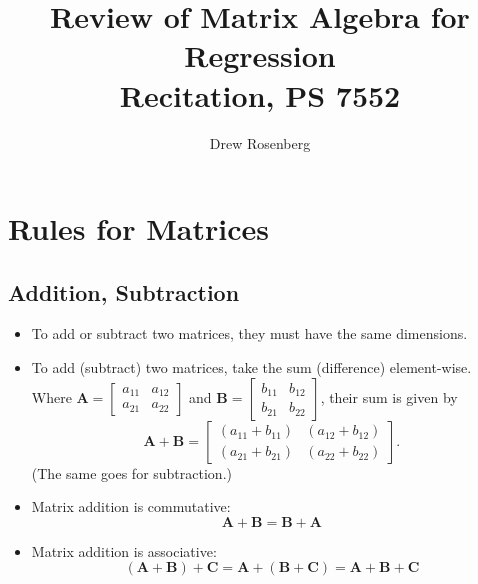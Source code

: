 \documentclass[12pt, letterpaper]{article}
\begin{document}
\title{Review of Matrix Algebra for Regression \\ \Large{Recitation, PS 7552}}
\author{Drew Rosenberg}
\date{}
\maketitle

\section{Rules for Matrices}
\subsection{Addition, Subtraction}
\begin{itemize}
\item To add or subtract two matrices, they must have the same dimensions.

\item To add (subtract) two matrices, take the sum (difference) element-wise. Where 
$\mathbf{A} = \left[
\begin{array}{cc}
a_{11} & a_{12} \\
a_{21} & a_{22} 
\end{array} \right]$ and 
$\mathbf{B} = \left[
\begin{array}{cc}
b_{11} & b_{12} \\
b_{21} & b_{22} 
\end{array} \right]$, their sum is given by
\begin{equation*}
\mathbf{A} + \mathbf{B}  =  \left[
\begin{array}{cc}
(a_{11}+ b_{11}) & (a_{12}+ b_{12}) \\
(a_{21}+ b_{21}) & (a_{22}+ b_{22})
\end{array} \right].
\end{equation*}
(The same goes for subtraction.)

\item Matrix addition is commutative:
\begin{equation*}
\mathbf{A}+\mathbf{B} = \mathbf{B}+\mathbf{A}
\end{equation*}

\item Matrix addition is associative:
\begin{equation*}
\left(\mathbf{A}+ \mathbf{B}\right)+ \mathbf{C} = \mathbf{A}+ \left(\mathbf{B}+ \mathbf{C}\right) = \mathbf{A}+ \mathbf{B}+ \mathbf{C}
\end{equation*}
\end{itemize}
\end{document}
